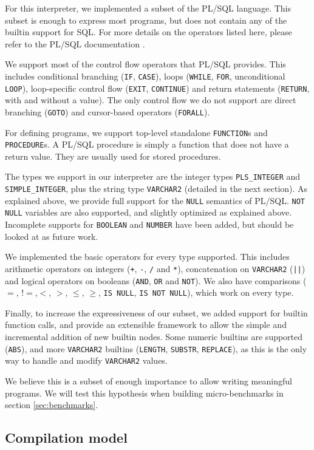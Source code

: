 \documentclass[twoside,11pt,a4paper]{article}
\newcommand{\maybe}[1]{\textit{(maybe ? #1)}}
\newcommand{\pls}[1]{\small\texttt{#1}\normalsize}
\newcommand{\plstype}[1]{\pls{#1}}
\newcommand{\varchar}{\plstype{VARCHAR2}}
\newcommand{\plsi}{\plstype{PLS\_INTEGER}}
\newcommand{\simpleint}{\plstype{SIMPLE\_INTEGER}}
\newcommand{\plsnull}{\pls{NULL}}
\begin{document}
For this interpreter, we implemented a subset of the PL/SQL language. This subset is enough to express most programs, but does not contain any of the builtin support for SQL. For more details on the operators listed here, please refer to the PL/SQL documentation \cite{plsdoc}.

We support most of the control flow operators that PL/SQL provides. This includes conditional branching (\pls{IF}, \pls{CASE}), loops (\pls{WHILE}, \pls{FOR}, unconditional \pls{LOOP}), loop-specific control flow (\pls{EXIT}, \pls{CONTINUE}) and return statements (\pls{RETURN}, with and without a value). The only control flow we do not support are direct branching (\pls{GOTO}) and cursor-based operators (\pls{FORALL}).

For defining programs, we support top-level standalone \pls{FUNCTION}s and \pls{PROCEDURE}s. A PL/SQL procedure is simply a function that does not have a return value. They are usually used for stored procedures.

The types we support in our interpreter are the integer types \plsi{} and \simpleint{}, plus the string type \varchar{} (detailed in the next section). As explained above, we provide full support for the \plsnull{} semantics of PL/SQL. \pls{NOT NULL} variables are also supported, and slightly optimized as explained above. Incomplete supports for \pls{BOOLEAN} and \pls{NUMBER} have been added, but should be looked at as future work.

We implemented the basic operators for every type supported. This includes arithmetic operators on integers (\pls{+}, \pls{-}, \pls{/} and \pls{*}), concatenation on \varchar{} (\pls{||}) and logical operators on booleans (\pls{AND}, \pls{OR} and \pls{NOT}). We also have comparisons ($=$, $!=$,$<$, $>$, $\leq$, $\geq$, \pls{IS NULL}, \pls{IS NOT NULL}), which work on every type.

Finally, to increase the expressiveness of our subset, we added support for builtin function calls, and provide an extensible framework to allow the simple and incremental addition of new builtin nodes. Some numeric builtins are supported (\pls{ABS}), and more \varchar{} builtins (\pls{LENGTH}, \pls{SUBSTR}, \pls{REPLACE}), as this is the only way to handle and modify \varchar{} values.

We believe this is a subset of enough importance to allow writing meaningful programs. We will test this hypothesis when building micro-benchmarks in section \ref{sec:benchmarks}.

\subsection{Compilation model}
\label{sec:compilationmodel}
\end{document}
